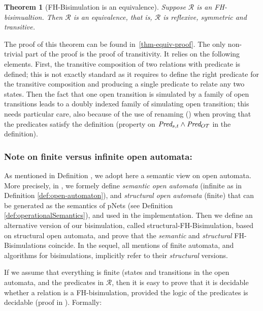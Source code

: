 \documentclass{lmcs}
\newcommand{\TODO}[1]{\textcolor{red}{\textbf{[TODO:#1]}}}
\newtheorem{theorem}{Theorem}
\begin{document}
\begin{theorem}[FH-Bisimulation is an equivalence]\label{thm-equiv} Suppose $\mathcal{R}$ 
is an FH-bisimualtion. Then $\mathcal{R}$ is an equivalence, that is, $\mathcal{R}$ is 
reflexive, symmetric and transitive.
\end{theorem}

The proof of this theorem can be found in~\ref{thm-equiv-proof}. The
only non-trivial part of the proof is the proof of transitivity. It
relies on the following elements. First,  the transitive composition
of two relations with predicate is defined; this is not exactly
standard as it requires to define the right predicate for the
transitive composition and producing a single predicate to relate any
two states. Then the fact that one open transition is simulated by a
family of open transitions leads to a doubly indexed family of
simulating open transition; this needs particular care, also because
of the use of renaming (\Post) when proving that the predicates
satisfy the definition (property on $\Pred_{s,t} \land \Pred_{OT}$ in
the definition).  


\medskip



\subsubsection*{Note on finite versus infinite open automata:} 
As mentioned in Definition \pageref{def:open-automaton}, we adopt here a semantic view on open automata. More precisely, in \cite{hou:hal-02406098}, we formely define
\emph{semantic open automata} (infinite as in Definition \ref{def:open-automaton}),
and \emph{structural open automata} (finite) that can be generated as
the semantics of pNets (see Definition \ref{def:operationalSemantics}), and used in the implementation. Then we define
an alternative version of our bisimulation, called
structural-FH-Bisimulation, based on structural open automata, and
prove that the \emph{semantic} and \emph{structural} FH-Bisimulations coincide.
In the sequel, all mentions of finite automata, and algorithms for
bisimulations, implicitly refer to their \emph{structural} versions.

If we assume that everything is finite (states and transitions in the
open automata, and the predicates in $\mathcal{R}$, then it is easy to
prove that it is decidable whether a relation is a 
FH-bisimulation, provided the logic of the predicates is
decidable (proof in \cite{henrio:Forte2016}). Formally:
\end{document}
